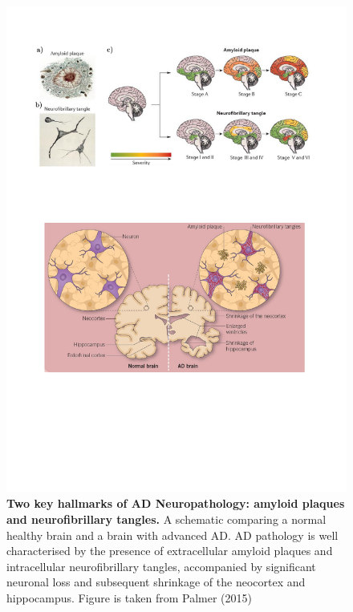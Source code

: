 \vspace{0.5cm}
\begin{figure}[!ht]
	\centering
	\includegraphics[page=1,trim={0 7cm 1cm 13cm},clip, scale = 0.75]{Figures/Introduction_Figures.pdf}
	\captionsetup{width=0.95\textwidth,singlelinecheck=off}
	\caption[Two key hallmarks of AD Neuropathology: amyloid plaques and neurofibrillary tangles]%
	{\textbf{Two key hallmarks of AD Neuropathology: amyloid plaques and neurofibrillary tangles.} A schematic comparing a normal healthy brain and a brain with advanced AD. AD pathology is well characterised by the presence of extracellular amyloid plaques and intracellular neurofibrillary tangles, accompanied by significant neuronal loss and subsequent shrinkage of the neocortex and hippocampus. Figure is taken from Palmer (2015)\cite{AlanM.Palmer2015}
	}
	\label{fig:AD_intro}
\end{figure} 

